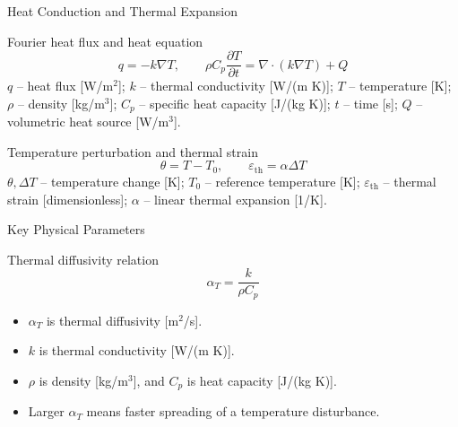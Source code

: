 \documentclass[aspectratio=169,10pt]{beamer}
\begin{document}
\begin{frame}{Heat Conduction and Thermal Expansion}
  \begin{block}{Fourier heat flux and heat equation}
    \[
      q = -k\nabla T,
      \qquad
      \rho C_p\frac{\partial T}{\partial t}
      =
      \nabla\cdot(k\nabla T)+Q
    \]
    \scriptsize
    $q$ -- heat flux [W/m$^2$]; $k$ -- thermal conductivity [W/(m K)];
    $T$ -- temperature [K]; $\rho$ -- density [kg/m$^3$];
    $C_p$ -- specific heat capacity [J/(kg K)]; $t$ -- time [s];
    $Q$ -- volumetric heat source [W/m$^3$].
  \end{block}
  \vskip 4pt
  \begin{block}{Temperature perturbation and thermal strain}
    \[
      \theta = T-T_0,
      \qquad
      \varepsilon_{\mathrm{th}}=\alpha\Delta T
    \]
    \scriptsize
    $\theta,\Delta T$ -- temperature change [K]; $T_0$ -- reference
    temperature [K]; $\varepsilon_{\mathrm{th}}$ -- thermal strain
    [dimensionless]; $\alpha$ -- linear thermal expansion [1/K].
  \end{block}
\end{frame}

\begin{frame}{Key Physical Parameters}
  \begin{block}{Thermal diffusivity relation}
    \[
      \alpha_T = \frac{k}{\rho C_p}
    \]
  \end{block}
  \vskip 6pt
  \begin{itemize}
    \item $\alpha_T$ is thermal diffusivity [m$^2$/s].
    \item $k$ is thermal conductivity [W/(m K)].
    \item $\rho$ is density [kg/m$^3$], and $C_p$ is heat capacity [J/(kg K)].
    \item Larger $\alpha_T$ means faster spreading of a temperature disturbance.
  \end{itemize}
\end{frame}
\end{document}
